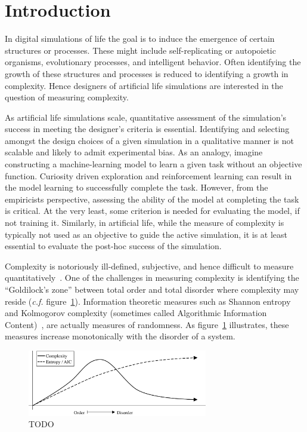 \section{Introduction}
\label{sec:intro}

In digital simulations of life the goal is to induce the emergence of certain
structures or processes. These might include self-replicating or autopoietic
organisms, evolutionary processes, and intelligent behavior. Often identifying
the growth of these structures and processes is reduced to identifying a growth
in complexity. Hence designers of artificial life simulations are interested in
the question of measuring complexity.

As artificial life simulations scale, quantitative assessment of the
simulation's success in meeting the designer's criteria is essential.
Identifying and selecting amongst the design choices of a given simulation in a
qualitative manner is not scalable and likely to admit experimental bias. As an
analogy, imagine constructing a machine-learning model to learn a given task
without an objective function. Curiosity driven exploration and reinforcement
learning can result in the model learning to successfully complete the task.
However, from the empiricists perspective, assessing the ability of the model
at completing the task is critical. At the very least, some criterion is needed
for evaluating the model, if not training it. Similarly, in artificial life,
while the measure of complexity is typically not used as an objective to guide
the active simulation, it is at least essential to evaluate the post-hoc
success of the simulation.

Complexity is notoriously ill-defined, subjective, and hence difficult to
measure quantitatively~\citep{gell2002complexity, mitchell2009complexity,
wiesner2019measuring}. One of the challenges in measuring complexity is
identifying the ``Goldilock's zone'' between total order and total disorder
where complexity may reside (\emph{c.f.}
figure~\ref{fig:complexity_and_entropy}). Information theoretic measures such
as Shannon entropy~\citep{shannon1948} and Kolmogorov complexity (sometimes
called Algorithmic Information Content)~\citep{kolmogorov1965, solomonoff1964},
are actually measures of randomness. As figure~\ref{fig:complexity_and_entropy}
illustrates, these measures increase monotonically with the disorder of a
system.

\begin{figure}
\centering
\includegraphics[width=0.7\textwidth]{figures/complexity_and_entropy}
\caption{TODO}
\label{fig:complexity_and_entropy}
\end{figure}

